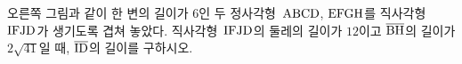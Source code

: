 \noindent\begin{minipage}[t]{0.58\linewidth}\vspace{0pt}\raggedright 오른쪽 그림과 같이 한 변의 길이가 $6$인 두 정사각형~$\mathrm{ABCD}$, $\mathrm{EFGH}$를 직사각형~$\mathrm{IFJD}$가 생기도록 겹쳐 놓았다. 직사각형~$\mathrm{IFJD}$의 둘레의 길이가 $12$이고 $\overline{\mathrm{BH}}$의 길이가 $2\sqrt{41}$일 때, $\overline{\mathrm{ID}}$의 길이를 구하시오. \end{minipage}\hfill\begin{minipage}[t]{0.4\linewidth}\vspace{0pt}\centering \resizebox{\ifdim\width>\linewidth\linewidth\else\width\fi}{!}{}\end{minipage}\par
